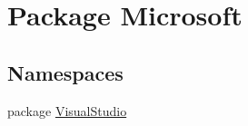 \hypertarget{namespace_microsoft}{\section{Package Microsoft}
\label{namespace_microsoft}
}
\subsection*{Namespaces}
\begin{DoxyCompactItemize}
\item 
package \hyperlink{namespace_microsoft_1_1_visual_studio}{Visual\+Studio}
\end{DoxyCompactItemize}
